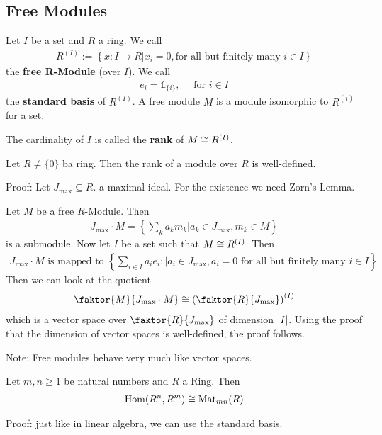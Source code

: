 \subsection{Free Modules}

\begin{definition}[]
Let $I$ be a set and $R$ a ring. We call
\begin{align*}
	R^{(I)} := \left\{x: I \to R \big\vert x_i = 0, \text{for all but finitely many }i \in I\right\}
\end{align*}
the \textbf{free R-Module} (over $I$). We call
\begin{align*}
	e_i = \mathds{1}_{\{i\}}, \quad \text{ for } i \in I
\end{align*}
the \textbf{standard basis} of $R^{(I)}$. A free module $M$ is a module isomorphic to $R^{(i)}$ for a set.

The cardinality of $I$ is called the \textbf{rank} of $M \cong R^{(I)}$.
\end{definition}

\begin{lemma}[]
	Let $R \neq \{0\}$ ba ring. Then the rank of a module over $R$ is well-defined.
\end{lemma}
Proof: Let $J_{\max} \subseteq R$. a maximal ideal. For the existence we need Zorn's Lemma.

Let $M$ be a free $R$-Module. Then
\begin{align*}
	J_{\max} \cdot M = \left\{\sum_{k}a_km_k \big\vert a_k \in J_{\max}, m_k \in M\right\}
\end{align*}
is a submodule. Now let $I$ be a set such that $M \cong R^{(I)}$. Then
\begin{align*}
	J_{\max} \cdot M \text{ is mapped to } \left\{\sum_{i \in I}a_i e_i: \big\vert a_i \in J_{\max}, a_i = 0 \text{ for all but finitely many }i \in I\right\}
\end{align*}
Then we can look at the quotient
\begin{align*}
	\faktor{M}{J_{\max} \cdot M} \iso \left(
		\faktor{R}{J_{\max}}
	\right)^{(I)}
\end{align*}
which is a vector space over $\faktor{R}{J_{\max}}$ of dimension $\vert I\vert$. Using the proof that the dimension of vector spaces is well-defined, the proof follows.

Note: Free modules behave very much like vector spaces.


\begin{proposition}[]
Let $m,n \geq 1$ be natural numbers and $R$ a Ring. Then
\begin{align*}
	\operatorname{Hom}(R^{n},R^{m}) \cong \text{Mat}_{mn}(R)
\end{align*}
\end{proposition}
Proof: just like in linear algebra, we can use the standard basis.


